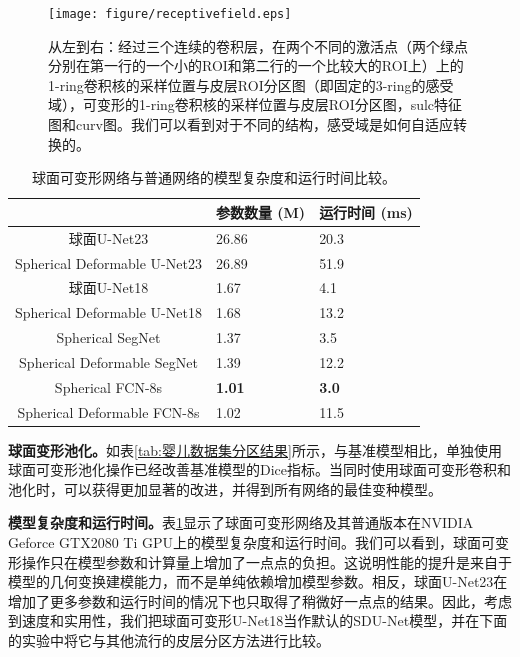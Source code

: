 \begin{figure}[t]
	\centering
	\texttt{[image: figure/receptivefield.eps]}
	\caption{从左到右：经过三个连续的卷积层，在两个不同的激活点（两个绿点分别在第一行的一个小的ROI和第二行的一个比较大的ROI上）上的1-ring卷积核的采样位置与皮层ROI分区图（即固定的3-ring的感受域），可变形的1-ring卷积核的采样位置与皮层ROI分区图，sulc特征图和curv图。我们可以看到对于不同的结构，感受域是如何自适应转换的。}
	\label{fig:receptivefield_sampling_points}
\end{figure}

\begin{table}[h]
		\caption{\label{tab:模型复杂度和运行时间结果}球面可变形网络与普通网络的模型复杂度和运行时间比较。}
		\centering
		\begin{tabularx}{0.85\linewidth}{c|X<{\centering}|X<{\centering}}
			\hline
			& 参数数量 (M)           & 运行时间 (ms)         \\
			\hline
			球面U-Net23                & 26.86      &    20.3 \\
			Spherical Deformable U-Net23    &  	26.89           		&   51.9   \\   
			\hline
			球面U-Net18               & 1.67                  	&	4.1	 \\
			Spherical Deformable U-Net18   &	1.68	                &	13.2	  \\
			\hline
			Spherical SegNet                 & 	1.37                    &			3.5 \\
			Spherical Deformable SegNet    &			1.39            &  	 12.2	 \\
			\hline
			Spherical FCN-8s                 &  		\textbf{1.01}                &	\textbf{3.0}	 \\
			Spherical Deformable FCN-8s   & 	1.02                    &11.5  \\
			\hline 
		\end{tabularx}
\end{table}

\textbf{球面变形池化。}如表\ref{tab:婴儿数据集分区结果}所示，与基准模型相比，单独使用球面可变形池化操作已经改善基准模型的Dice指标。当同时使用球面可变形卷积和池化时，可以获得更加显著的改进，并得到所有网络的最佳变种模型。

\textbf{模型复杂度和运行时间。}表\ref{tab:模型复杂度和运行时间结果}显示了球面可变形网络及其普通版本在NVIDIA Geforce GTX2080 Ti GPU上的模型复杂度和运行时间。我们可以看到，球面可变形操作只在模型参数和计算量上增加了一点点的负担。这说明性能的提升是来自于模型的几何变换建模能力，而不是单纯依赖增加模型参数。相反，球面U-Net23在增加了更多参数和运行时间的情况下也只取得了稍微好一点点的结果。因此，考虑到速度和实用性，我们把球面可变形U-Net18当作默认的SDU-Net模型，并在下面的实验中将它与其他流行的皮层分区方法进行比较。

